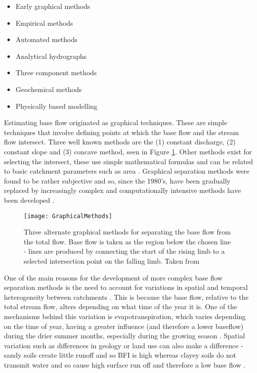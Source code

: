 \documentclass[DIV=calc, paper=a4, fontsize=11pt, twocolumn]{scrartcl}	 %
\begin{document}
\begin{itemize}
	\item Early graphical methods
	\item Empirical methods
	\item Automated methods
	\item Analytical hydrographs
	\item Three component methods
	\item Geochemical methods
	\item Physically based modelling
\end{itemize}


Estimating base flow originated as graphical techniques. These are simple techniques that involve defining points at which the base flow and the stream flow intersect. Three well known methods are the (1) constant discharge, (2) constant slope and (3) concave method, seen in Figure \ref{fig:Graphical}. Other methods exist for selecting the intersect, these use simple mathematical formulas and can be related to basic catchment parameters such as area \citep{Brodie2005}. Graphical separation methods were found to be rather subjective and so, since the 1980's, have been gradually replaced by increasingly complex and computationally intensive methods have been developed \citet{Li2013, Stadnyk2015}.

\begin{figure}
	\texttt{[image: GraphicalMethods]}
	\caption[TOC caption]{Three alternate graphical methods for separating the base flow from the total flow. Base flow is taken as the region below the chosen line - lines are produced by connecting the start of the rising limb to a selected intersection point on the falling limb. Taken from \citet{Brodie2005}}
	\label{fig:Graphical}
	\centering
\end{figure}

One of the main reasons for the development of more complex base flow separation methods is the need to account for variations in spatial and temporal heterogeneity between catchments \citep{Tallaksen1995}. This is because the base flow, relative to the total stream flow, alters depending on what time of the year it is. One of the mechanisms behind this variation is evapotranspiration, which varies depending on the time of year, having a greater influence (and therefore a lower baseflow) during the drier summer months, especially during the growing season \citep{Tallaksen1995}. Spatial variation such as differences in geology or land use can also make a difference - sandy soils create little runoff and so BFI is high whereas clayey soils do not transmit water and so cause high surface run off and therefore a low base flow \citep{Li2013}.
\end{document}
